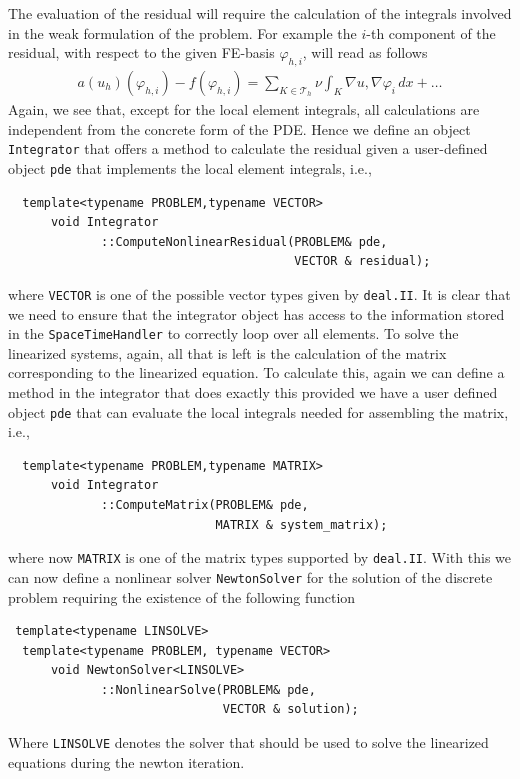 \documentclass[prodmode,acmtoms]{acmsmall}
\numberwithin{equation}{section}
\renewcommand{\phi}{\varphi}
\newcommand{\deal}{\texttt{deal.II}}
\begin{document}
The evaluation of the residual will require the calculation of the integrals 
involved in the weak formulation of the problem. For example 
the $i$-th component of the residual, with respect to the given FE-basis 
$\phi_{h,i}$, will read as follows
\begin{align}\label{eq:residual_vector}
 a(u_h)(\phi_{h,i}) - f(\phi_{h,i}) = \sum_{K\in \mathcal T_h} \nu\int_K \nabla u, \nabla \phi_i\,dx + \ldots
 \end{align}
Again, we see that, except for the local element integrals, all 
calculations are independent from the concrete form of the PDE. 
Hence we define an object \texttt{Integrator}
that offers a method to calculate the residual given a user-defined 
object \texttt{pde} that implements the local element integrals, i.e.,
\begin{lstlisting}
  template<typename PROBLEM,typename VECTOR>
      void Integrator
             ::ComputeNonlinearResidual(PROBLEM& pde, 
                                        VECTOR & residual);
\end{lstlisting}
where \texttt{VECTOR} is one of the possible vector types given by \deal{}.
It is clear that we need to ensure that the integrator object has access
to the information stored in the \texttt{SpaceTimeHandler}
to correctly loop over all elements.
To solve the linearized systems, again, all that is left is the calculation
of the matrix corresponding to the linearized equation. To calculate this,
again we can define a method in the integrator that does exactly this provided
we have a user defined object \texttt{pde} that can evaluate the local 
integrals needed for assembling the matrix, i.e.,
\begin{lstlisting}
  template<typename PROBLEM,typename MATRIX>
      void Integrator
             ::ComputeMatrix(PROBLEM& pde, 
                             MATRIX & system_matrix);
\end{lstlisting}
where now \texttt{MATRIX} is one of the matrix types supported by \deal{}.
With this we can now define a nonlinear solver \texttt{NewtonSolver} 
for the solution of the discrete problem requiring the existence of the 
following function
\begin{lstlisting}
 template<typename LINSOLVE>
  template<typename PROBLEM, typename VECTOR>
      void NewtonSolver<LINSOLVE>
             ::NonlinearSolve(PROBLEM& pde, 
                              VECTOR & solution);
\end{lstlisting}
Where \texttt{LINSOLVE} denotes the solver that should be used to solve the 
linearized equations during the newton iteration.
\end{document}
